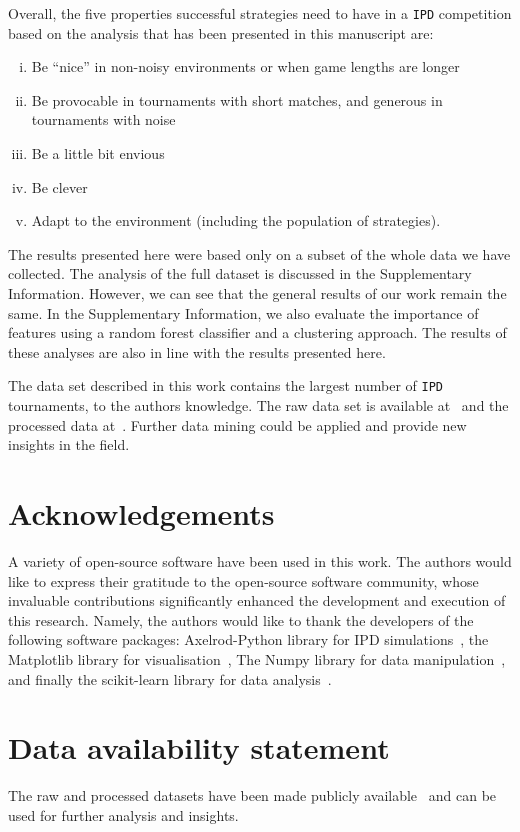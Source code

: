 \documentclass{article}
\def\IPD{\texttt{IPD}}
\begin{document}
Overall, the five properties successful strategies need to have in a \IPD{} competition
based on the analysis that has been presented in this manuscript are:

\begin{enumerate}[(i)]
    \item Be ``nice'' in non-noisy environments or when game lengths are longer
    \item Be provocable in tournaments with short matches, and generous in tournaments with noise
    \item Be a little bit envious
    \item Be clever
    \item Adapt to the environment (including the population of strategies).
\end{enumerate}

The results presented here were based only on a subset of the whole data we have
collected. The analysis of the full dataset is discussed in the Supplementary Information.
However, we can see that the general results of our work remain the same. In the
Supplementary Information, we also evaluate the importance of features using a
random forest classifier and a clustering approach. The results of these
analyses are also in line with the results presented here.

The data set described in this work contains the largest number of \IPD{}
tournaments, to the authors knowledge. The raw data set is available
at~\cite{raw_data} and the processed data at~\cite{data}. Further data mining
could be applied and provide new insights in the field.




\section{Acknowledgements}

A variety of open-source software have been used in this work. The authors would
like to express their gratitude to the open-source software community, whose
invaluable contributions significantly enhanced the development and execution of
this research. Namely, the authors would like to thank the developers of the
following software packages: Axelrod-Python library for IPD
simulations~\cite{axelrodproject}, the Matplotlib library for
visualisation~\cite{hunter2007matplotlib}, The Numpy library for data
manipulation~\cite{walt2011numpy}, and finally the scikit-learn library for data
analysis~\cite{scikit-learn}.

\section{Data availability statement}

The raw and processed datasets have been made publicly available~\cite{data,
raw_data} and can be used for further analysis and insights.
\end{document}
